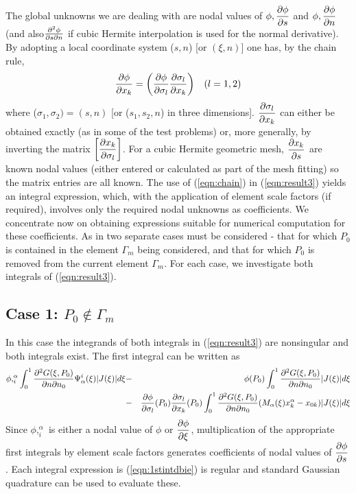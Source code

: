 The global unknowns we are dealing with are nodal values of
$\phi, \dfrac{\partial \phi}{\partial s} $ and $\phi, \dfrac{\partial \phi}{\partial n} $ (and
also$\frac{\partial^{2}\phi}{\partial s\partial n}$ if cubic Hermite interpolation is used
for the normal derivative).  By adopting a local coordinate system ($s,n$) [or
$(\xi,n)$] one has, by the chain rule,
\begin{eqnarray}
  \dfrac{\partial \phi}{\partial x_{k}} =\left( \dfrac{\partial \phi}{\partial \sigma_{l}}  \dfrac{\partial \sigma_{l}}{\partial x_{k}} \right) & & (l=1,2)
 \label{eqn:chain}
\end{eqnarray}
where ($\sigma_{1},\sigma_{2}) = (s,n)$ [or ($s_{1}, s_{2}, n$) in three
dimensions]. $ \dfrac{\partial \sigma_{l}}{\partial x_{k}} $ can either be obtained exactly (as in
some of the test problems) or, more generally, by inverting the matrix
$\left[ \dfrac{\partial x_{k}}{\partial \sigma_{l}} \right]$.  For a cubic Hermite geometric mesh,
$ \dfrac{\partial x_{k}}{\partial s} $ are known nodal values (either entered or calculated as
part of the mesh fitting) so the matrix entries are all known.  The use of
(\ref{eqn:chain}) in (\ref{eqn:result3}) yields an integral expression, which,
with the application of element scale factors (if required), involves only the
required nodal unknowns as coefficients.  We concentrate now on obtaining
expressions suitable for numerical computation for these coefficients.  As in
\cite{liu:1992} two separate cases must be considered - that for which $P_{0}$
is contained in the element $\Gamma_{m}$ being considered, and that for which
$P_{0}$ is removed from the current element $\Gamma_{m}$.  For each case, we
investigate both integrals of (\ref{eqn:result3}).

\subsection*{Case 1:  $P_{0}\notin\Gamma_{m}$} 
In this case the integrands of both integrals in (\ref{eqn:result3}) are
nonsingular and both integrals exist.  The first integral can be written as
\begin{eqnarray}
 \phi,_{i}^{\alpha}\int_{0}^{1}\frac{\partial^{2}G(\xi,P_{0})}
  {\partial n\partial n_{0}}\Psi_{\alpha}^{i}(\xi)|J(\xi)|d\xi &-& \phi(P_{0})
  \int_{0}^{1}\frac{\partial^{2}G(\xi,P_{0})}
  {\partial n\partial n_{0}}|J(\xi)|d\xi\nonumber\\
 &-& \dfrac{\partial \phi}{\partial \sigma_{l}} (P_{0}) \dfrac{\partial \sigma_{l}}{\partial x_{k}} (P_{0})
   \int_{0}^{1}\frac{\partial^{2}G(\xi,P_{0})}{\partial n\partial n_{0}}
   (M_{\alpha}(\xi)x_{k}^{\alpha}-x_{0k})|J(\xi)|d\xi
 \label{eqn:1stintdbie}
\end{eqnarray}
Since $\phi,_{i}^{\alpha}$ is either a nodal value of $\phi$ or
$ \dfrac{\partial \phi}{\partial \xi} $, multiplication of the appropriate first integrals by
element scale factors generates coefficients of nodal values of
$ \dfrac{\partial \phi}{\partial s} $ .  Each integral expression is (\ref{eqn:1stintdbie}) is regular
and standard Gaussian quadrature can be used to evaluate these.

